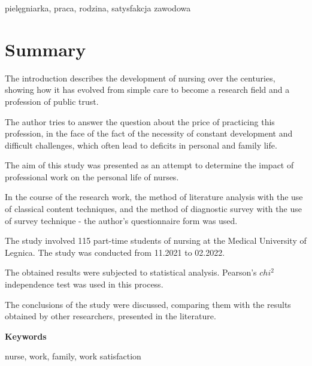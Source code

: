 \documentclass[a4paper,12pt,twoside,openright]{mwrep}
\begin{document}
\vspace{\baselineskip} 

pielęgniarka, praca, rodzina, satysfakcja zawodowa

\chapter*{Summary}

The introduction describes the development of nursing over the centuries, showing how it has evolved from simple care to become a research field and a profession of public trust. 

The author tries to answer the question about the price of practicing this profession, in the face of the fact of the necessity of constant development and difficult challenges, which often lead to deficits in personal and family life. 

The aim of this study was presented as an attempt to determine the impact of professional work on the personal life of nurses.


In the course of the research work, the method of literature analysis with the use of classical content techniques, and the method of diagnostic survey with the use of survey technique - the author's questionnaire form was used. 

The study involved 115 part-time students of nursing at the Medical University of Legnica. The study was conducted from 11.2021 to 02.2022.

The obtained results were subjected to statistical analysis. Pearson's $chi^2$ independence test was used in this process.

The conclusions of the study were discussed, comparing them with the results obtained by other researchers, presented in the literature.

\vspace{\baselineskip} 
\vspace{\baselineskip} 
\vspace{\baselineskip} 
\large
\textbf{Keywords}
\normalsize
\vspace{\baselineskip} 

nurse, work, family, work satisfaction


%
%




\makeatletter 
\renewcommand\@biblabel[1]{#1.~} 
\makeatother
\end{document}
